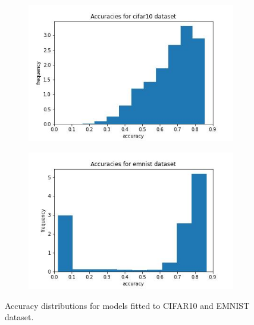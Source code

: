 \documentclass{article} %
\begin{document}
\begin{figure}
    \begin{subfigure}{.5\textwidth}
        \centering
        \includegraphics[width=.8\linewidth]{cifar10/accuracy_distribution.jpg}
        \label{fig:accuracy_distribution_cifar10}
    \end{subfigure}%
    \begin{subfigure}{.5\textwidth}
        \centering
        \includegraphics[width=.8\linewidth]{emnist/accuracy_distribution.jpg}
        \label{fig:accuracy_distribution_emnist}
    \end{subfigure}
    \caption{Accuracy distributions for models fitted to CIFAR10 and EMNIST dataset.}
    \label{fig:acc_distributions}
\end{figure}
\end{document}
